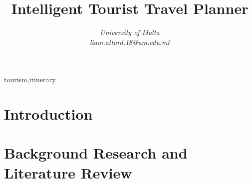 \documentclass[conference]{IEEEtran}
\title{Intelligent Tourist Travel Planner}
\author{\IEEEauthorblockN{Liam Attard [0299300L] }
\IEEEauthorblockA{Department of Artificial Intelligence} 
\textit{University of Malta}\\
\textit{liam.attard.18@um.edu.mt}}
\begin{document}
  \maketitle

  \begin{abstract}
  \end{abstract}

  \begin{IEEEkeywords}
  tourism,itinerary.
  \end{IEEEkeywords}

  \section{Introduction}
    

  \section{Background Research and Literature Review}
    

  
  
\end{document}

